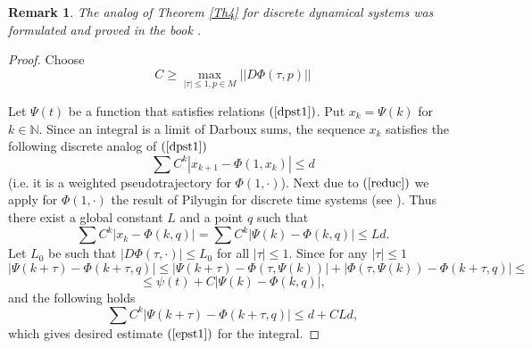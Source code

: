 \documentclass[11pt]{article}
\newcounter{razdel}[section]
\theoremstyle{Mystyle}
\newtheorem{Remark}[razdel]{Remark}
\begin{document}
\begin{Remark}
The analog of Theorem \ref{Th4} for discrete dynamical systems was formulated and proved in the book \cite{Pil}. 
\end{Remark}




\begin{proof}
Choose 
\begin{equation}
\label{reduc}
C\geq\max_{|\tau|\leq 1, p\in M} ||D\Phi(\tau, p)||
\end{equation}

Let $\Psi(t)$ be a function that satisfies relations $(\ref{dpst1})$. Put $x_k = \Psi(k)$ for $k\in\mathbb{N}$. Since an integral is a limit of Darboux sums, the sequence $x_k$ satisfies the following discrete analog of $(\ref{dpst1})$
$$\sum C^k|x_{k+1} - \Phi(1,x_k)|\leq d$$
(i.e. it is a weighted pseudotrajectory for $\Phi(1,\cdot)$).
Next due to $(\ref{reduc})$ we apply for $\Phi(1,\cdot)$ the result of Pilyugin for discrete time systems (see \cite{Pil}). Thus there exist a global constant $L$ and a point $q$ such that
$$\sum C^k|x_k - \Phi(k,q)| = \sum C^k|\Psi(k) - \Phi(k,q)|\leq Ld.$$
Let $L_0$ be such that
$|D\Phi(\tau,\cdot)|\leq L_0$ for all $|\tau|\leq 1$.
Since for any $|\tau|\leq 1$
$$|\Psi(k+\tau) - \Phi(k+\tau,q)|\leq |\Psi(k+\tau) - \Phi(\tau,\Psi(k))| + |\Phi(\tau,\Psi(k)) -\Phi(k+\tau,q)|\leq$$ 
$$\leq\psi(t) + C|\Psi(k) - \Phi(k,q)|,$$
and the following holds
$$\sum C^k|\Psi(k+\tau) - \Phi(k+\tau,q)|\leq d + CLd,$$
which gives desired estimate $(\ref{epst1})$ for the integral.

\end{proof}
\end{document}
